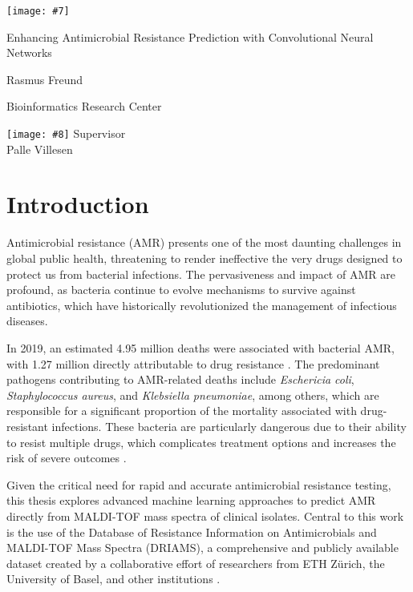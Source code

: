 \documentclass[english,11pt,a4paper,titlepage]{article}
\newcommand{\frontpageBlue}[8]{
	\begin{titlepage}
		\pagecolor{sectioncolor}\afterpage{\nopagecolor}
		\centering
		\texttt{[image: \#7]}\par
		\vspace{1cm}
		{\fontsize{34}{40}\selectfont\color{white}\titlefont #1\par} %
		\vspace{2cm}
		{\color{white}\Large\headingfont #2\par} %
		{\color{white}\large\headingfont #3\par} %
		\vspace{1cm}
		{\color{white}\Large\headingfont #4\par} %
		{\color{white}\large\headingfont #5\par} %
		\vspace{1cm}
		\texttt{[image: \#8]} %
		\vfill
		{\color{white}\Large\headingfont #6}
	\end{titlepage}
}
\newcommand{\frontpageWhite}[8]{
	\begin{titlepage}
		\centering
		\texttt{[image: \#7]}\par
		\vspace{1cm}
		{\fontsize{26}{28}\selectfont\color{sectioncolor}\titlefont #1\par} %
		\vspace{2cm}
		{\Large\headingfont\color{sectioncolor} #2\par} %
		{\large\headingfont\color{sectioncolor} #3\par} %
		\vspace{0.1cm}
		{\Large\headingfont\color{sectioncolor} #4\par} %
		{\large\headingfont\color{sectioncolor} #5\par} %
		\vspace{1cm}
		\texttt{[image: \#8]} %
		\vfill
		{\Large\headingfont\color{sectioncolor} #6}
	\end{titlepage}	
}
\begin{document}
\setlength{\parindent}{25pt} %




\frontpageWhite{Enhancing Antimicrobial Resistance Prediction with Convolutional Neural Networks}{Rasmus Freund}{Bioinformatics Research Center}{}{}{Supervisor\\Palle Villesen}{img/ausegl.png}{img/au_blue.png}


\begin{abstract}
	\noindent %
	\kant[1]
\end{abstract}


\section*{Introduction}
Antimicrobial resistance (AMR) presents one of the most daunting challenges in global public health, threatening to render ineffective the very drugs designed to protect us from bacterial infections. The pervasiveness and impact of AMR are profound, as bacteria continue to evolve mechanisms to survive against antibiotics, which have historically revolutionized the management of infectious diseases. 

In 2019, an estimated 4.95 million deaths were associated with bacterial AMR, with 1.27 million directly attributable to drug resistance	\cite{murrayGlobalBurdenBacterial2022}. The predominant pathogens contributing to AMR-related deaths include \textit{Eschericia coli}, \textit{Staphylococcus aureus}, and \textit{Klebsiella pneumoniae}, among others, which are responsible for a significant proportion of the mortality associated with drug-resistant infections. These bacteria are particularly dangerous due to their ability to resist multiple drugs, which complicates treatment options and increases the risk of severe outcomes \cite{murrayGlobalBurdenBacterial2022}.

Given the critical need for rapid and accurate antimicrobial resistance testing, this thesis explores advanced machine learning approaches to predict AMR directly from MALDI-TOF mass spectra of clinical isolates. Central to this work is the use of the Database of Resistance Information on Antimicrobials and MALDI-TOF Mass Spectra (DRIAMS), a comprehensive and publicly available dataset created by a collaborative effort of researchers from ETH Zürich, the University of Basel, and other institutions \cite{weis2021driams}.
\end{document}
